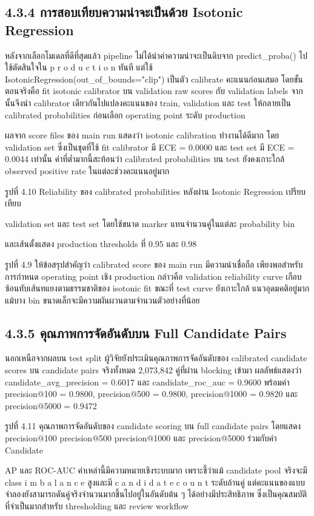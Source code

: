 \documentclass[12pt,a4paper]{report}
\begin{document}
\subsection*{4.3.4 การสอบเทียบความน่าจะเป็นด้วย Isotonic Regression}
หลังจากเลือกโมเดลที่ดีที่สุดแล้ว pipeline ไม่ได้นำค่าความน่าจะเป็นดิบจาก predict\_proba() ไปใช้ตัดสินใจใน p r o d u c t i o n ทันที แต่ใช้ IsotonicRegression(out\_of\_bounds="clip") เป็นตัว calibrate คะแนนก่อนเสมอ โดยขั้นตอนจริงคือ fit isotonic calibrator บน validation raw scores กับ validation labels จากนั้นจึงนำ calibrator เดียวกันไปแปลงคะแนนของ train, validation และ test ให้กลายเป็น calibrated probabilities ก่อนเลือก operating point ระดับ production\par
ผลจาก score files ของ main run แสดงว่า isotonic calibration ทำงานได้ดีมาก โดย validation set ซึ่งเป็นชุดที่ใช้ fit calibrator มี ECE = 0.0000 และ test set มี ECE = 0.0044 เท่านั้น ค่าที่ต่ำมากนี้สะท้อนว่า calibrated probabilities บน test ยังคงเกาะใกล้ observed positive rate ในแต่ละช่วงคะแนนอยู่มาก\par
\begin{center}\small รูปที่ 4.10 Reliability ของ calibrated probabilities หลังผ่าน Isotonic Regression เปรียบเทียบ\end{center}
validation set และ test set โดยใช้ขนาด marker แทนจำนวนคู่ในแต่ละ probability bin\par
และเส้นตั้งแสดง production thresholds ที่ 0.95 และ 0.98\par
\clearpage
\begin{center}\small รูปที่ 4.9 ให้ข้อสรุปสำคัญว่า calibrated score ของ main run มีความน่าเชื่อถือ เพียงพอสำหรับการกำหนด operating point เชิง production กล่าวคือ validation reliability curve เกือบซ้อนทับเส้นทแยงตามธรรมชาติของ isotonic fit ขณะที่ test curve ยังเกาะใกล้ แนวอุดมคติอยู่มาก แม้บาง bin ขนาดเล็กจะมีความผันผวนตามจำนวนตัวอย่างที่น้อย\end{center}
\subsection*{4.3.5 คุณภาพการจัดอันดับบน Full Candidate Pairs}
นอกเหนือจากผลบน test split ผู้วิจัยยังประเมินคุณภาพการจัดอันดับของ calibrated candidate scores บน candidate pairs จริงทั้งหมด 2,073,842 คู่ที่ผ่าน blocking เข้ามา ผลลัพธ์แสดงว่า candidate\_avg\_precision = 0.6017 และ candidate\_roc\_auc = 0.9600 พร้อมค่า precision@100 = 0.9800, precision@500 = 0.9800, precision@1000 = 0.9820 และ precision@5000 = 0.9472\par
\begin{center}\small รูปที่ 4.11 คุณภาพการจัดอันดับของ candidate scoring บน full candidate pairs โดยแสดง precision@100 precision@500 precision@1000 และ precision@5000 ร่วมกับค่า Candidate\end{center}
AP และ ROC-AUC ค่าเหล่านี้มีความหมายเชิงระบบมาก เพราะชี้ว่าแม้ candidate pool จริงจะมี class i m b a l a n c e สูงและมี c a n d i d a t e c o u n t ระดับล้านคู่ แต่คะแนนของแบบจำลองยังสามารถดันคู่จริงจำนวนมากขึ้นไปอยู่ในอันดับต้น ๆ ได้อย่างมีประสิทธิภาพ ซึ่งเป็นคุณสมบัติที่จำเป็นมากสำหรับ thresholding และ review workflow\par
\clearpage
\end{document}
